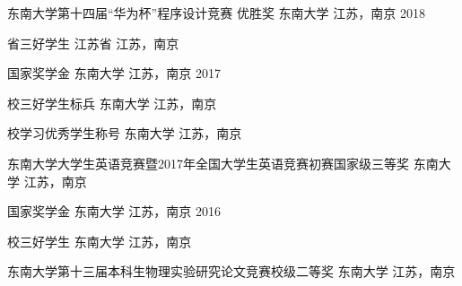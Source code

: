 \vspace{-4.0mm}


\vspace{-1.5mm}
\begin{cvhonors}
\cvhonor
{东南大学第十四届“华为杯”程序设计竞赛 优胜奖} %
{东南大学} %
{江苏，南京} %
{2018} %

\cvhonor
{省三好学生} %
{江苏省} %
{江苏，南京} %
{} %

\cvhonor
{国家奖学金} %
{东南大学} %
{江苏，南京} %
{2017} %

\cvhonor
{校三好学生标兵} %
{东南大学} %
{江苏，南京} %
{} %


\cvhonor
{校学习优秀学生称号} %
{东南大学} %
{江苏，南京} %
{} %

\cvhonor
{东南大学大学生英语竞赛暨2017年全国大学生英语竞赛初赛国家级三等奖}
{东南大学}
{江苏，南京}
{}


\cvhonor
{国家奖学金} %
{东南大学} %
{江苏，南京} %
{2016} %


\cvhonor
{校三好学生} %
{东南大学} %
{江苏，南京} %
{} %


\cvhonor
{东南大学第十三届本科生物理实验研究论文竞赛校级二等奖}
{东南大学}
{江苏，南京}
{}
\end{cvhonors}